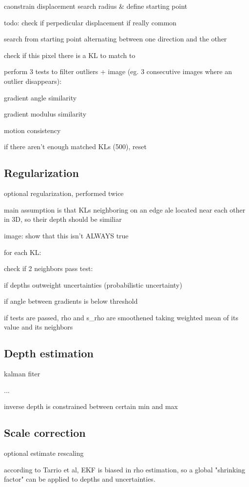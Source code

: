    caonstrain displacement search radius \& define starting point

 todo: check if perpedicular displacement if really common


 search from starting point alternating between one direction and the other

 check if this pixel there is a KL to match to

 perform 3 tests to filter outliers + image (eg. 3 consecutive images where an outlier disappears):

  gradient angle similarity

  gradient modulus similarity

  motion consistency

 if there aren't enough matched KLs (500), reset

\subsection{Regularization}

 optional regularization, performed twice

 main assumption is that KLs neighboring on an edge ale located near each other in 3D, so their depth should be similiar

 image: show that this isn't ALWAYS true

 for each KL:

  check if 2 neighbors pass test:

   if depths outweight uncertainties (probabilistic uncertainty)

   if angle between gradients is below threshold

  if tests are passed, rho and s\_rho are smoothened taking weighted mean of its value and its neighbors

\subsection{Depth estimation}

 kalman fiter

 ...

 inverse depth is constrained between certain min and max

\subsection{Scale correction}


 optional estimate rescaling

 according to Tarrio et al, EKF is biased in rho estimation, so a global "shrinking factor" can be applied to depths and uncertainties.









